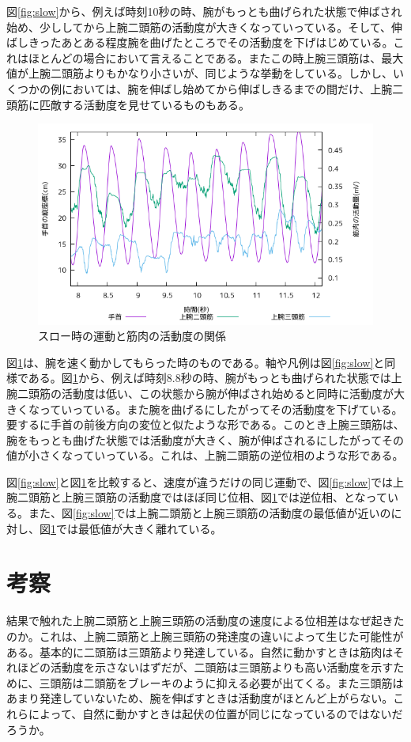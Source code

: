 \documentclass{jsarticle}
\begin{document}
図\ref{fig:slow}から、例えば時刻10秒の時、腕がもっとも曲げられた状態で伸ばされ始め、少ししてから上腕二頭筋の活動度が大きくなっていっている。そして、伸ばしきったあとある程度腕を曲げたところでその活動度を下げはじめている。これはほとんどの場合において言えることである。またこの時上腕三頭筋は、最大値が上腕二頭筋よりもかなり小さいが、同じような挙動をしている。しかし、いくつかの例においては、腕を伸ばし始めてから伸ばしきるまでの間だけ、上腕二頭筋に匹敵する活動度を見せているものもある。

\begin{figure}[h]
  \begin{center}
    \includegraphics[width=15cm]{images/s2proto.png}
  \end{center}
  \caption{スロー時の運動と筋肉の活動度の関係}
  \label{fig:fast}
\end{figure}
図\ref{fig:fast}は、腕を速く動かしてもらった時のものである。軸や凡例は図\ref{fig:slow}と同様である。図\ref{fig:fast}から、例えば時刻8.8秒の時、腕がもっとも曲げられた状態では上腕二頭筋の活動度は低い、この状態から腕が伸ばされ始めると同時に活動度が大きくなっていっている。また腕を曲げるにしたがってその活動度を下げている。要するに手首の前後方向の変位と似たような形である。このとき上腕三頭筋は、腕をもっとも曲げた状態では活動度が大きく、腕が伸ばされるにしたがってその値が小さくなっていっている。これは、上腕二頭筋の逆位相のような形である。

図\ref{fig:slow}と図\ref{fig:fast}を比較すると、速度が違うだけの同じ運動で、図\ref{fig:slow}では上腕二頭筋と上腕三頭筋の活動度ではほぼ同じ位相、図\ref{fig:fast}では逆位相、となっている。また、図\ref{fig:slow}では上腕二頭筋と上腕三頭筋の活動度の最低値が近いのに対し、図\ref{fig:fast}では最低値が大きく離れている。
\section{考察}
結果で触れた上腕二頭筋と上腕三頭筋の活動度の速度による位相差はなぜ起きたのか。これは、上腕二頭筋と上腕三頭筋の発達度の違いによって生じた可能性がある。基本的に二頭筋は三頭筋より発達している。自然に動かすときは筋肉はそれほどの活動度を示さないはずだが、二頭筋は三頭筋よりも高い活動度を示すために、三頭筋は二頭筋をブレーキのように抑える必要が出てくる。また三頭筋はあまり発達していないため、腕を伸ばすときは活動度がほとんど上がらない。これらによって、自然に動かすときは起伏の位置が同じになっているのではないだろうか。
\end{document}
